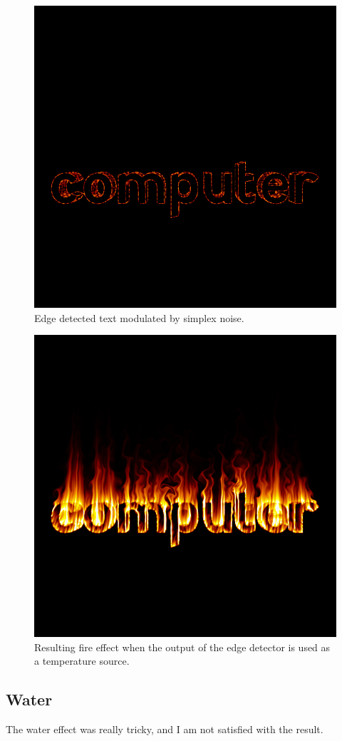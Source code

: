 \documentclass{acmsiggraph}               %
\begin{document}
\begin{figure}[H]
    \centering
    \includegraphics[width=0.7\columnwidth]{fire1.png}
    \caption{Edge detected text modulated by simplex noise.}
\end{figure}

\begin{figure}[H]
    \centering
    \includegraphics[width=0.7\columnwidth]{fire2.png}
    \caption{Resulting fire effect when the output of the
	edge detector is used as a temperature source.}
\end{figure}

\subsection{Water}

The water effect was really tricky, and I am not satisfied with the result.
\end{document}

